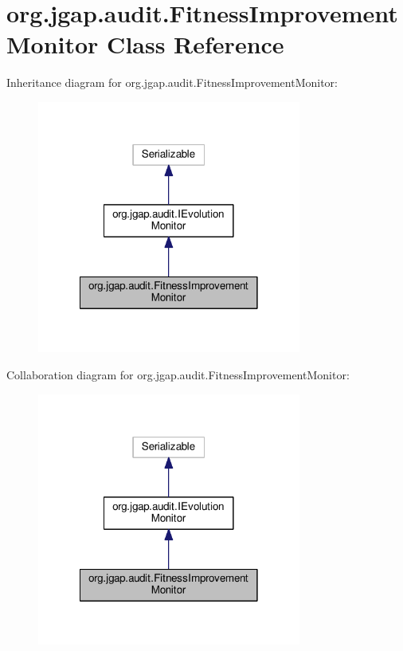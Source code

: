 \hypertarget{classorg_1_1jgap_1_1audit_1_1_fitness_improvement_monitor}{\section{org.\-jgap.\-audit.\-Fitness\-Improvement\-Monitor Class Reference}
\label{classorg_1_1jgap_1_1audit_1_1_fitness_improvement_monitor}
}


Inheritance diagram for org.\-jgap.\-audit.\-Fitness\-Improvement\-Monitor\-:
\nopagebreak
\begin{figure}[H]
\begin{center}
\leavevmode
\includegraphics[width=246pt]{classorg_1_1jgap_1_1audit_1_1_fitness_improvement_monitor__inherit__graph}
\end{center}
\end{figure}


Collaboration diagram for org.\-jgap.\-audit.\-Fitness\-Improvement\-Monitor\-:
\nopagebreak
\begin{figure}[H]
\begin{center}
\leavevmode
\includegraphics[width=246pt]{classorg_1_1jgap_1_1audit_1_1_fitness_improvement_monitor__coll__graph}
\end{center}
\end{figure}
